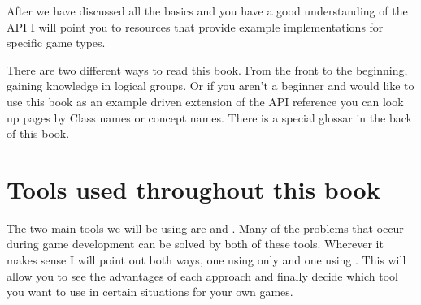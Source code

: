 After we have discussed all the basics and you have a good understanding of the
\cocos{} API I will point you to resources that provide example implementations
for specific game types.

There are two different ways to read this book. From the front to the beginning,
gaining knowledge in logical groups. Or if you aren't a beginner and would like
to use this book as an example driven extension of the API reference you can
look up pages by Class names or concept names. There is a special glossar in the
back of this book.

\section{Tools used throughout this book}
The two main tools we will be using are \cocos{} and \spriteb{}. Many of the
problems that occur during game development can be solved by both of these
tools. Wherever it makes sense I will point out both ways, one using only
\cocos{} and one using \spriteb{}. This will allow you to see the advantages of each approach
and finally decide which tool you want to use in certain situations for your own
games.
